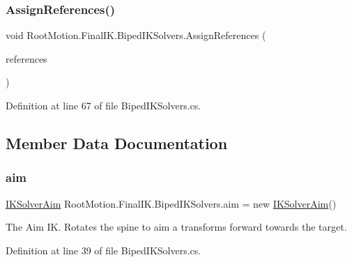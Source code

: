 \subsubsection{\texorpdfstring{Assign\+References()}{AssignReferences()}}
{\footnotesize\ttfamily void Root\+Motion.\+Final\+I\+K.\+Biped\+I\+K\+Solvers.\+Assign\+References (\begin{DoxyParamCaption}\item[{\mbox{\hyperlink{class_root_motion_1_1_biped_references}{Biped\+References}}}]{references }\end{DoxyParamCaption})}



Definition at line 67 of file Biped\+I\+K\+Solvers.\+cs.



\subsection{Member Data Documentation}
\mbox{\label{class_root_motion_1_1_final_i_k_1_1_biped_i_k_solvers_ab5ef210271441f309029f7016ef4fd44}} 
\subsubsection{\texorpdfstring{aim}{aim}}
{\footnotesize\ttfamily \mbox{\hyperlink{class_root_motion_1_1_final_i_k_1_1_i_k_solver_aim}{I\+K\+Solver\+Aim}} Root\+Motion.\+Final\+I\+K.\+Biped\+I\+K\+Solvers.\+aim = new \mbox{\hyperlink{class_root_motion_1_1_final_i_k_1_1_i_k_solver_aim}{I\+K\+Solver\+Aim}}()}



The Aim IK. Rotates the spine to aim a transform\textquotesingle{}s forward towards the target. 



Definition at line 39 of file Biped\+I\+K\+Solvers.\+cs.

\mbox{\label{class_root_motion_1_1_final_i_k_1_1_biped_i_k_solvers_aec701b71b2b3697df1ff49632cb41468}} 
